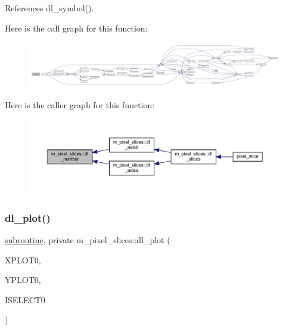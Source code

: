 References dl\+\_\+symbol().

Here is the call graph for this function\+:
\nopagebreak
\begin{figure}[H]
\begin{center}
\leavevmode
\includegraphics[width=350pt]{namespacem__pixel__slices_a7d9372496e88c384aea5ad1b26750d1b_cgraph}
\end{center}
\end{figure}
Here is the caller graph for this function\+:
\nopagebreak
\begin{figure}[H]
\begin{center}
\leavevmode
\includegraphics[width=350pt]{namespacem__pixel__slices_a7d9372496e88c384aea5ad1b26750d1b_icgraph}
\end{center}
\end{figure}
\mbox{\label{namespacem__pixel__slices_aa70737b5f5945b2f513163ee5c40942d}} 
\subsubsection{\texorpdfstring{dl\+\_\+plot()}{dl\_plot()}}
{\footnotesize\ttfamily \hyperlink{M__stopwatch_83_8txt_acfbcff50169d691ff02d4a123ed70482}{subroutine}, private m\+\_\+pixel\+\_\+slices\+::dl\+\_\+plot (\begin{DoxyParamCaption}\item[{}]{X\+P\+L\+O\+T0,  }\item[{}]{Y\+P\+L\+O\+T0,  }\item[{}]{I\+S\+E\+L\+E\+C\+T0 }\end{DoxyParamCaption})\hspace{0.3cm}{\ttfamily [private]}}



